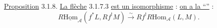\uline{Proposition} 3.1.8. \uline{La flèche} 3.1.7.3 \uline{est un isomorphisme} : \uline{on a la ``''} :
\[
 R\underline{\mathrm{Hom}}_{\mathcal A}(f^*L,Rf^!M)
 \xrightarrow{\sim} Rf^!R\mathrm{Hom}_{\mathcal A}(L,M).
\]
